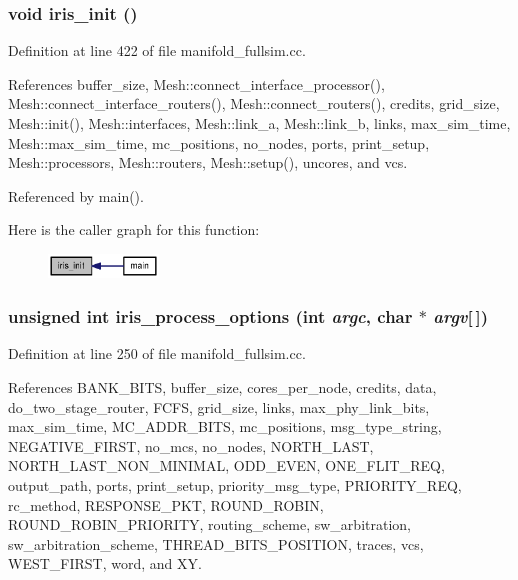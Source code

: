 \subsubsection[{iris\_\-init}]{\setlength{\rightskip}{0pt plus 5cm}void iris\_\-init ()}\label{manifold__fullsim_8cc_9ceb71c1e1d68963b68464d4bd3aed81}




Definition at line 422 of file manifold\_\-fullsim.cc.

References buffer\_\-size, Mesh::connect\_\-interface\_\-processor(), Mesh::connect\_\-interface\_\-routers(), Mesh::connect\_\-routers(), credits, grid\_\-size, Mesh::init(), Mesh::interfaces, Mesh::link\_\-a, Mesh::link\_\-b, links, max\_\-sim\_\-time, Mesh::max\_\-sim\_\-time, mc\_\-positions, no\_\-nodes, ports, print\_\-setup, Mesh::processors, Mesh::routers, Mesh::setup(), uncores, and vcs.

Referenced by main().

Here is the caller graph for this function:\nopagebreak
\begin{figure}[H]
\begin{center}
\leavevmode
\includegraphics[width=83pt]{manifold__fullsim_8cc_9ceb71c1e1d68963b68464d4bd3aed81_icgraph}
\end{center}
\end{figure}
\subsubsection[{iris\_\-process\_\-options}]{\setlength{\rightskip}{0pt plus 5cm}unsigned int iris\_\-process\_\-options (int {\em argc}, \/  char $\ast$ {\em argv}[$\,$])}\label{manifold__fullsim_8cc_d1d4500f982f63302d71d34a7d5381dd}




Definition at line 250 of file manifold\_\-fullsim.cc.

References BANK\_\-BITS, buffer\_\-size, cores\_\-per\_\-node, credits, data, do\_\-two\_\-stage\_\-router, FCFS, grid\_\-size, links, max\_\-phy\_\-link\_\-bits, max\_\-sim\_\-time, MC\_\-ADDR\_\-BITS, mc\_\-positions, msg\_\-type\_\-string, NEGATIVE\_\-FIRST, no\_\-mcs, no\_\-nodes, NORTH\_\-LAST, NORTH\_\-LAST\_\-NON\_\-MINIMAL, ODD\_\-EVEN, ONE\_\-FLIT\_\-REQ, output\_\-path, ports, print\_\-setup, priority\_\-msg\_\-type, PRIORITY\_\-REQ, rc\_\-method, RESPONSE\_\-PKT, ROUND\_\-ROBIN, ROUND\_\-ROBIN\_\-PRIORITY, routing\_\-scheme, sw\_\-arbitration, sw\_\-arbitration\_\-scheme, THREAD\_\-BITS\_\-POSITION, traces, vcs, WEST\_\-FIRST, word, and XY.

